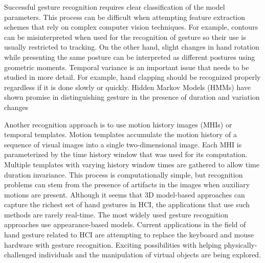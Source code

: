 Successful gesture recognition requires clear classification of the model parameters. This process can be difficult when attempting feature extraction schemes that rely on complex computer vision techniques. For example, contours can be misinterpreted when used for the recognition of gesture so their use is usually restricted to tracking. On the other hand, slight changes in hand rotation while presenting the same posture can be interpreted as different postures using geometric moments. Temporal variance is an important issue that needs to be studied in more detail. For example, hand clapping should be recognized properly regardless if it is done slowly or quickly. Hidden Markov Models (HMMs) have shown promise in distinguishing gesture in the presence of duration and variation changes

Another recognition approach is to use motion history images (MHIs) or temporal templates. Motion templates accumulate the motion history of a sequence of visual images into a single two-dimensional image. Each MHI is parameterized by the time history window that was used for its computation. Multiple templates with varying history window times are gathered to allow time duration invariance. This process is computationally simple, but recognition problems can stem from the presence of artifacts in the images when auxiliary motions are present. Although it seems that 3D model-based approaches can capture the richest set of hand gestures in HCI, the applications that use such methods are rarely real-time. The most widely used gesture recognition approaches use appearance-based models. Current applications in the field of hand gesture related to HCI are attempting to replace the keyboard and mouse hardware with gesture recognition. Exciting possibilities with helping physically-challenged individuals and the manipulation of virtual objects are being explored.





